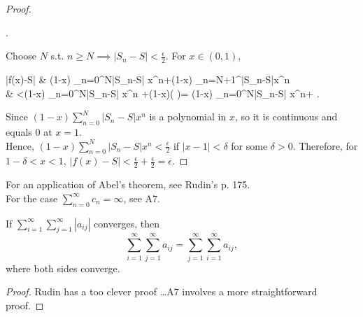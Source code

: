 \begin{thm}
\begin{proof}
\begin{flalign*}
			.\end{flalign*}
		Choose $N$ s.t. $n\ge N \implies \left|S_n-S\right|<\frac{\epsilon}{2} $.
		For $x \in (0,1)$,
		\begin{flalign*}
			\left|f(x)-S\right| & \le (1-x) \sum_{n=0}^{N}{\left|S_n-S\right| x^{n}}+(1-x) \sum_{n=N+1}^{\infty}{\left|S_n-S\right|x^{n}}     \\
			                    & <(1-x) \sum_{n=0}^{N}{\left|S_n-S\right| x^{n}} +(1-x)\left(  \cdot {}\right)=
			(1-x) \sum_{n=0}^{N}{\left|S_n-S\right| x^{n}}+
			.\end{flalign*}
		Since $(1-x)\sum_{n=0}^{N}{\left|S_n-S\right| x^{n}}$ is a polynomial in $x$, so it is continuous and equals $0$ at $x=1$.\\
		Hence, $(1-x)\sum_{n=0}^{N}{\left|S_n-S\right| x^{n}}<\frac{\epsilon}{2}$ if $\left|x-1\right| <\delta$ for some $\delta>0$. Therefore, for $1-\delta<x<1$, $\left|f(x)-S\right|<\frac{\epsilon}{2}+\frac{\epsilon}{2}=\epsilon$.
	\end{proof}
	\begin{note}
		For an application of Abel's theorem, see Rudin's p. 175.\\
		For the case $\sum_{n=0}^{\infty}{c_n}=\infty$, see A7.
	\end{note}
\end{thm}

\begin{thm}[3]
	If $\sum_{i=1}^{\infty}{\sum_{j=1}^{\infty}{\left|a_{ij}\right|}}$ converges, then \[
		\sum_{i=1}^{\infty}{\sum_{j=1}^{\infty}{a_{ij}}}= \sum_{j=1}^{\infty}{\sum_{i=1}^{\infty}{a_{ij}}},\] where both sides converge.
	\begin{proof}
		Rudin has a too clever proof \ldots  A7 involves a more straightforward proof.
	\end{proof}
\end{thm}

